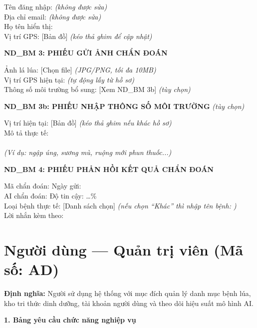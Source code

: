 \documentclass[12pt,a4paper]{article}
\begin{document}
\noindent Tên đăng nhập: \dotfill \textit{(không được sửa)} \\
Địa chỉ email: \dotfill \textit{(không được sửa)} \\
Họ tên hiển thị: \dotfill \\
Vị trí GPS: [Bản đồ] \textit{(kéo thả ghim để cập nhật)}

\vspace{0.3cm}
\noindent\textbf{ND\_BM 3: PHIẾU GỬI ẢNH CHẨN ĐOÁN}

\noindent Ảnh lá lúa: [Chọn file] \textit{(JPG/PNG, tối đa 10MB)} \\
Vị trí GPS hiện tại: \dotfill \textit{(tự động lấy từ hồ sơ)} \\
Thông số môi trường bổ sung: [Xem ND\_BM 3b] \textit{(tùy chọn)}

\vspace{0.2cm}
\noindent\textbf{ND\_BM 3b: PHIẾU NHẬP THÔNG SỐ MÔI TRƯỜNG} \textit{(tùy chọn)}

\noindent Vị trí hiện tại: [Bản đồ] \textit{(kéo thả ghim nếu khác hồ sơ)} \\
Mô tả thực tế: \dotfill \\
\dotfill \\
\textit{(Ví dụ: ngập úng, sương mù, ruộng mới phun thuốc...)}

\vspace{0.3cm}
\noindent\textbf{ND\_BM 4: PHIẾU PHẢN HỒI KẾT QUẢ CHẨN ĐOÁN}

\noindent Mã chẩn đoán: \dotfill \quad Ngày gửi: \dotfill \\
AI chẩn đoán: \dotfill \quad Độ tin cậy: \dots\% \\
Loại bệnh thực tế: [Danh sách chọn] \textit{(nếu chọn ``Khác'' thì nhập tên bệnh: \dotfill)} \\
Lời nhắn kèm theo: \dotfill \\
\dotfill

\section{Người dùng --- Quản trị viên (Mã số: AD)}

\textbf{Định nghĩa:} Người sử dụng hệ thống với mục đích quản lý danh mục bệnh lúa, kho tri thức dinh dưỡng, tài khoản người dùng và theo dõi hiệu suất mô hình AI.

\vspace{0.3cm}
\textbf{1. Bảng yêu cầu chức năng nghiệp vụ}
\end{document}
